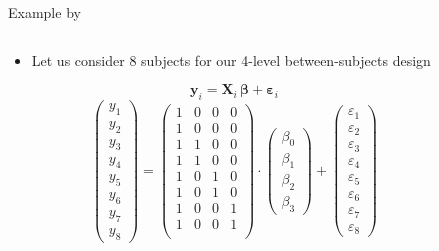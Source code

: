 \documentclass[aspectratio=169]{beamer}
\newcommand{\vect}[1]{\mathbf{#1}}
\newcommand{\mat}[1]{\mathbf{#1}}
\newcommand{\gvect}[1]{\boldsymbol{#1}}
\begin{document}
\begin{frame}{Example by \citet{Schad2020}}
  \begin{columns}
    \begin{column}[t]{.5\textwidth}
  \begin{itemize}
    \item Let us consider 8 subjects for our 4-level between-subjects design
  \end{itemize}
\[
  \vect{y}_i = \mat{X}_i \, \gvect{\beta} + \gvect{\varepsilon}_i
\]
\[
  \begin{pmatrix}
    y_1 \\
    y_2 \\
    y_3 \\
    y_4 \\
    y_5 \\
    y_6 \\
    y_7 \\
    y_8
  \end{pmatrix} = 
  \begin{pmatrix}
    1 & 0 & 0 & 0 \\ 
    1 & 0 & 0 & 0 \\ 
    1 & 1 & 0 & 0 \\ 
    1 & 1 & 0 & 0 \\ 
    1 & 0 & 1 & 0 \\ 
    1 & 0 & 1 & 0 \\ 
    1 & 0 & 0 & 1 \\ 
    1 & 0 & 0 & 1 \\ 
  \end{pmatrix} \cdot
  \begin{pmatrix}
    \beta_0 \\
    \beta_1 \\
    \beta_2 \\
    \beta_3
  \end{pmatrix} +
  \begin{pmatrix}
    \varepsilon_1 \\
    \varepsilon_2 \\
    \varepsilon_3 \\
    \varepsilon_4 \\
    \varepsilon_5 \\
    \varepsilon_6 \\
    \varepsilon_7 \\
    \varepsilon_8
  \end{pmatrix}
\]
    \end{column}
    \begin{column}[t]{.5\textwidth}

\end{column}
\end{columns}
\end{frame}
\end{document}
